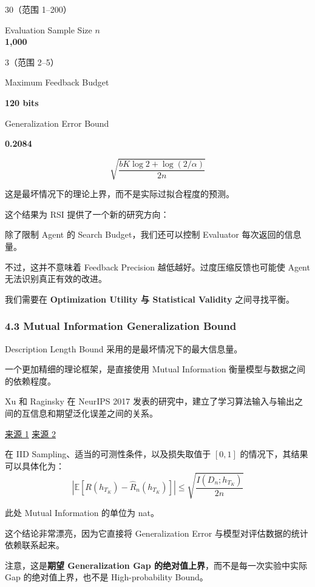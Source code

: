 30（范围 1--200）

Evaluation Sample Size \(n\)\\
\textbf{1,000}

3（范围 2--5）

Maximum Feedback Budget

\textbf{120 bits}

Generalization Error Bound

\textbf{0.2084}

\[\sqrt{\frac{bK\log 2+\log(2/\alpha)}{2n}}\]

这是最坏情况下的理论上界，而不是实际过拟合程度的预测。

这个结果为 RSI 提供了一个新的研究方向：

除了限制 Agent 的 Search Budget，我们还可以控制 Evaluator 每次返回的信息量。

不过，这并不意味着 Feedback Precision 越低越好。过度压缩反馈也可能使 Agent 无法识别真正有效的改进。

我们需要在 \textbf{Optimization Utility 与 Statistical Validity} 之间寻找平衡。

\hypertarget{part-2-20-0001-mutual-information-generalization-bound}{%
\subsubsection{4.3 Mutual Information Generalization Bound}\label{part-2-20-0001-mutual-information-generalization-bound}}

Description Length Bound 采用的是最坏情况下的最大信息量。

一个更加精细的理论框架，是直接使用 Mutual Information 衡量模型与数据之间的依赖程度。

Xu 和 Raginsky 在 NeurIPS 2017 发表的研究中，建立了学习算法输入与输出之间的互信息和期望泛化误差之间的关系。

\href{https://papers.nips.cc/paper_files/paper/2017/hash/ad71c82b22f4f65b9398f76d8be4c615-Abstract.html}{来源 1} \href{https://arxiv.org/abs/1705.07809}{来源 2}

在 IID Sampling、适当的可测性条件，以及损失取值于 \([0,1]\) 的情况下，其结果可以具体化为：
\[\boxed{
\left|
\mathbb E
\left[
R(h_{T_K})-\widehat R_n(h_{T_K})
\right]
\right|
\leq
\sqrt{
\frac{I(D_n;h_{T_K})}{2n}
}
}\]

此处 Mutual Information 的单位为 nat。

这个结论非常漂亮，因为它直接将 Generalization Error 与模型对评估数据的统计依赖联系起来。

注意，这是\textbf{期望 Generalization Gap 的绝对值上界}，而不是每一次实验中实际 Gap 的绝对值上界，也不是 High-probability Bound。

